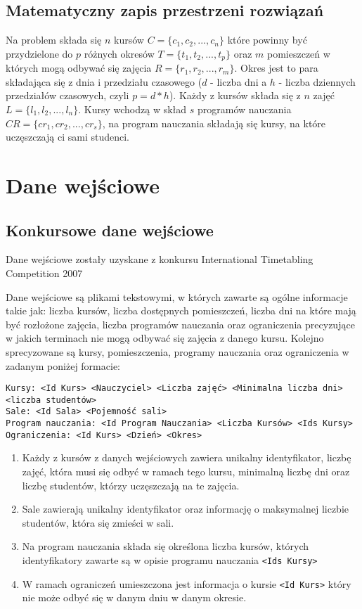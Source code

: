 \subsection{Matematyczny zapis przestrzeni rozwiązań} \cite{tabu}
\par Na problem składa się ${n}$ kursów ${C = \{c_{1}, c_{2},...,c_{n}\}}$ które powinny być przydzielone do ${p}$ różnych okresów ${T = \{t_{1}, t_{2},...,t_{p}\}}$ oraz ${m}$ pomieszczeń w których mogą odbywać się zajęcia ${R = \{r_{1}, r_{2},...,r_{m}\}}$. Okres jest to para składająca się z dnia i przedziału czasowego (${d}$ - liczba dni a ${h}$ - liczba dziennych przedziałów czasowych, czyli ${p = d * h}$). Każdy z kursów składa się z ${n}$ zajęć ${L = \{l_{1},l_{2},...,l_{n}\}}$. Kursy wchodzą w skład ${s}$ programów nauczania ${CR = \{cr_{1}, cr_{2}, ..., cr_{s}\}}$, na program nauczania składają się kursy, na które uczęszczają ci sami studenci. 

\section{Dane wejściowe}
\label{sec:input_format}
\subsection{Konkursowe dane wejściowe}
\par Dane wejściowe zostały uzyskane z konkursu International Timetabling Competition 2007
\par Dane wejściowe są plikami tekstowymi, w których zawarte są ogólne informacje takie jak: liczba kursów, liczba dostępnych pomieszczeń, liczba dni na które mają być rozłożone zajęcia, liczba programów nauczania oraz ograniczenia precyzujące w jakich terminach nie mogą odbywać się zajęcia z danego kursu. Kolejno sprecyzowane są kursy, pomieszczenia, programy nauczania oraz ograniczenia w zadanym poniżej formacie:
\begin{verbatim}
Kursy: <Id Kurs> <Nauczyciel> <Liczba zajęć> <Minimalna liczba dni> <liczba studentów>
Sale: <Id Sala> <Pojemność sali>
Program nauczania: <Id Program Nauczania> <Liczba Kursów> <Ids Kursy>
Ograniczenia: <Id Kurs> <Dzień> <Okres>
\end{verbatim}
\begin{enumerate}
\item Każdy z kursów z danych wejściowych zawiera unikalny identyfikator, liczbę zajęć, która musi się odbyć w ramach tego kursu, minimalną liczbę dni oraz liczbę studentów, którzy uczęszczają na te zajęcia. 
\item Sale zawierają unikalny identyfikator oraz informację o maksymalnej liczbie studentów, która się zmieści w sali.
\item Na program nauczania składa się określona liczba kursów, których identyfikatory zawarte są w opisie programu nauczania  \verb#<Ids Kursy>#

\item W ramach ograniczeń umieszczona jest informacja o kursie \verb#<Id Kurs>#
 który nie może odbyć się w danym dniu w danym okresie.
\end{enumerate}
